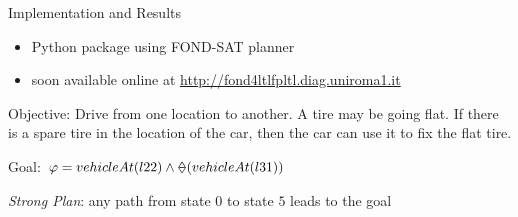 \documentclass[10pt]{beamer}
\begin{document}
\begin{frame}{Implementation and Results}
\begin{itemize}
\item \FONDFOR Python package using FOND-SAT planner
\item soon available online at \href{http://fond4ltlfpltl.diag.uniroma1.it}{http://fond4ltlfpltl.diag.uniroma1.it}
\end{itemize}

\begin{example}
Objective: Drive from one location to another. A tire may be going flat. If there is a spare tire in the location of the car, then the car can use it to fix the flat tire.

Goal: $\varphi = vehicleAt(l22) \lAND \Once (vehicleAt(l31))$

\textit{Strong Plan}: any path from state $0$ to state $5$ leads to the goal
\begin{figure}[h]
\centering
{}
\end{figure}

\end{example}


\end{frame}
\end{document}
